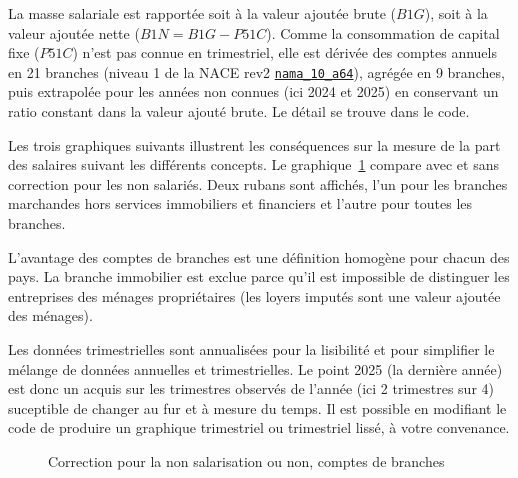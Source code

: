 \documentclass[
  french,
  9pt,
  a4paper,
]{article}
\begin{document}
La masse salariale est rapportée soit à la valeur ajoutée brute
(\(B1G\)), soit à la valeur ajoutée nette (\(B1N=B1G-P51C\)). Comme la
consommation de capital fixe (\(P51C\)) n'est pas connue en trimestriel,
elle est dérivée des comptes annuels en 21 branches (niveau 1 de la NACE
rev2 \hyperref[0]{\texttt{nama\_10\_a64}}), agrégée en 9 branches, puis
extrapolée pour les années non connues (ici 2024 et 2025) en conservant
un ratio constant dans la valeur ajouté brute. Le détail se trouve dans
le code.

Les trois graphiques suivants illustrent les conséquences sur la mesure
de la part des salaires suivant les différents concepts. Le
graphique~\ref{fig-psalcnc} compare avec et sans correction pour les non
salariés. Deux rubans sont affichés, l'un pour les branches marchandes
hors services immobiliers et financiers et l'autre pour toutes les
branches.

L'avantage des comptes de branches est une définition homogène pour
chacun des pays. La branche immobilier est exclue parce qu'il est
impossible de distinguer les entreprises des ménages propriétaires (les
loyers imputés sont une valeur ajoutée des ménages).

Les données trimestrielles sont annualisées pour la lisibilité et pour
simplifier le mélange de données annuelles et trimestrielles. Le point
2025 (la dernière année) est donc un acquis sur les trimestres observés
de l'année (ici 2 trimestres sur 4) suceptible de changer au fur et à
mesure du temps. Il est possible en modifiant le code de produire un
graphique trimestriel ou trimestriel lissé, à votre convenance.

\begin{figure}[H]

\caption{\label{fig-psalcnc}Correction pour la non salarisation ou non,
comptes de branches}


\end{figure}%
\end{document}
